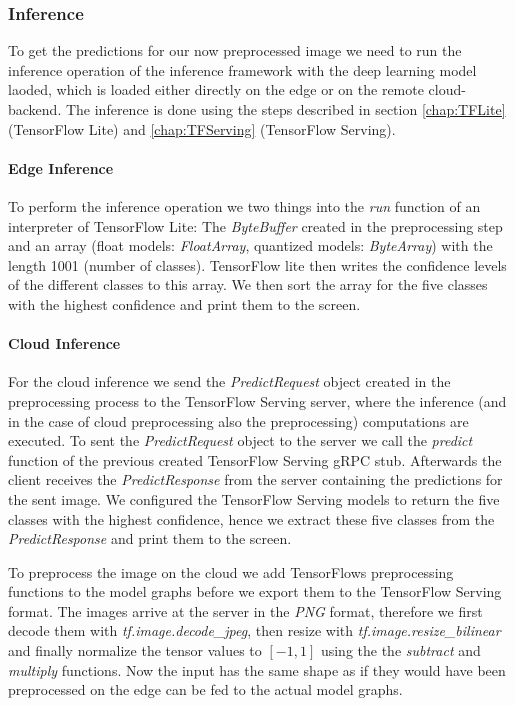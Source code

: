 

\subsubsection{Inference}
To get the predictions for our now preprocessed image we need to run the inference operation of the inference framework with the deep learning model laoded, which is loaded either directly on the edge or on the remote cloud-backend. 
The inference is done using the steps described in section \ref{chap:TFLite} (TensorFlow Lite) and \ref{chap:TFServing} (TensorFlow Serving).
\paragraph{Edge Inference}
To perform the inference operation we two things into the \emph{run} function of an interpreter of TensorFlow Lite: The \emph{ByteBuffer} created in the preprocessing step and an array (float models: \emph{FloatArray}, quantized models: \emph{ByteArray}) with the length 1001 (number of classes). TensorFlow lite then writes the confidence levels of the different classes to this array. We then sort the array for the five classes with the highest confidence and print them to the screen.

\paragraph{Cloud Inference}
\label{chap:CloudInfImpl}

For the cloud inference we send the \emph{PredictRequest} object created in the preprocessing process to the TensorFlow Serving server, where the inference (and in the case of cloud preprocessing also the preprocessing) computations are executed.
To sent the \emph{PredictRequest} object to the server we call the \emph{predict} function of the previous created TensorFlow Serving gRPC stub.
Afterwards the client receives the \emph{PredictResponse} from the server containing the predictions for the sent image. We configured the TensorFlow Serving models to return the five classes with the highest confidence, hence we extract these five classes from the \emph{PredictResponse} and print them to the screen.

To preprocess the image on the cloud we add TensorFlows preprocessing functions to the model graphs before we export them to the TensorFlow Serving format. The images arrive at the server in the \emph{PNG} format, therefore we first decode them with \emph{tf.image.decode\_jpeg}, then resize with \emph{tf.image.resize\_bilinear} and finally normalize the tensor values to $[-1,1]$ using the the \emph{subtract} and \emph{multiply} functions. Now the input has the same shape as if they would have been preprocessed on the edge can be fed to the actual model graphs.
